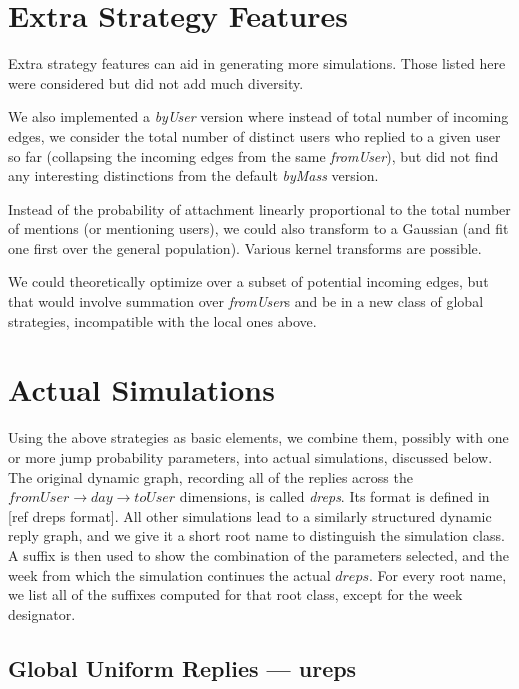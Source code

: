 \documentclass[10pt,oneside]{memoir}
\begin{document}
\section{Extra Strategy Features}
\label{extrastrategyfeatures}

Extra strategy features can aid in generating more simulations.  Those listed here were considered but did not add much diversity.


We also implemented a \emph{byUser} version where instead of total number of incoming edges, we consider the total number of distinct users who replied to a given user so far (collapsing the incoming edges from the same \emph{fromUser}), but did not find any interesting distinctions from the default \emph{byMass} version.


Instead of the probability of attachment linearly proportional to the total number of mentions (or mentioning users), we could also transform to a Gaussian (and fit one first over the general population).  Various kernel transforms are possible.


We could theoretically optimize over a subset of potential incoming edges, but that would involve summation over \emph{fromUser}s and be in a new class of global strategies, incompatible with the local ones above.


\pagebreak \section{Actual Simulations}
\label{actualsimulations}

Using the above strategies as basic elements, we combine them, possibly with one or more jump probability parameters, into actual simulations, discussed below.  The original dynamic graph, recording all of the replies across the $fromUser \rightarrow day \rightarrow toUser$ dimensions, is called \emph{dreps}.  Its format is defined in [ref dreps format].  All other simulations lead to a similarly structured dynamic reply graph, and we give it a short root name to distinguish the simulation class.  A suffix is then used to show the combination of the parameters selected, and the week from which the simulation continues the actual $dreps$.  For every root name, we list all of the suffixes computed for that root class, except for the week designator.


\subsection{Global Uniform Replies --- ureps}
\label{globaluniformrepliesureps}
\end{document}
